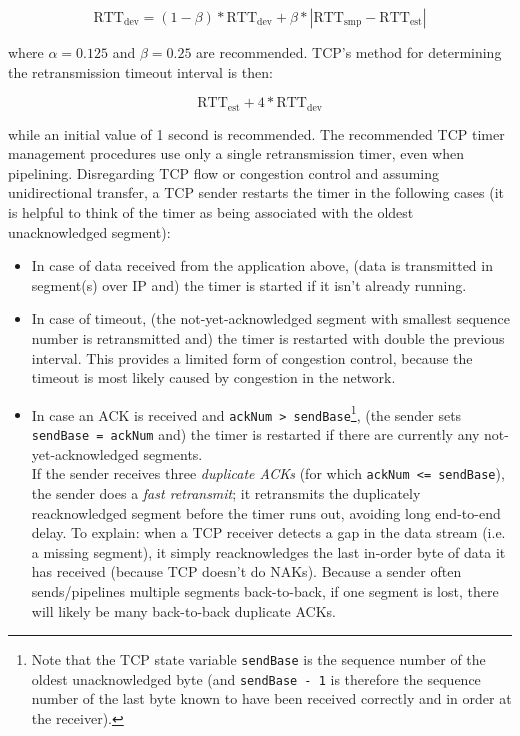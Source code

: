 \documentclass[8pt, table, xcdraw]{article}%
\begin{document}
\begin{equation}
    \text{RTT}_\text{dev} = (1 - \beta) * \text{RTT}_\text{dev} + \beta * |\text{RTT}_\text{smp} - \text{RTT}_\text{est}|
\end{equation}

where $\alpha = 0.125$ and $\beta = 0.25$ are recommended. TCP’s method for determining the retransmission
timeout interval is then:

\begin{equation}
    \text{RTT}_\text{est} + 4 * \text{RTT}_\text{dev}
\end{equation}

while an initial value of 1 second is recommended. The recommended TCP timer management procedures use only a single retransmission timer, even when pipelining. Disregarding TCP flow or congestion control and assuming unidirectional transfer, a TCP sender restarts the timer in the following cases (it is helpful to think of the timer as being associated with the oldest unacknowledged segment):

\begin{itemize}
    \item In case of data received from the application above, (data is transmitted in segment(s) over IP and) the timer is started if it isn't already running.
    \item In case of timeout, (the not-yet-acknowledged segment with smallest sequence number is retransmitted and) the timer is restarted with double the previous interval. This provides a limited form of congestion control, because the timeout is most likely caused by congestion in the network.
    \item In case an ACK is received and \lstinline{ackNum > sendBase}\footnote{Note that the TCP state variable \lstinline{sendBase} is the sequence number of the oldest unacknowledged byte (and \lstinline{sendBase - 1} is therefore the sequence number of the last byte known to have been received correctly and in order at the receiver).}, (the sender sets \lstinline{sendBase = ackNum} and) the timer is restarted if there are currently any not-yet-acknowledged segments.\\
    If the sender receives three \emph{duplicate ACKs} (for which \lstinline{ackNum <= sendBase}), the sender does a \emph{fast retransmit}; it retransmits the duplicately reacknowledged segment before the timer runs out, avoiding long end-to-end delay. To explain: when a TCP receiver detects a gap in the data stream (i.e. a missing segment), it simply reacknowledges the last in-order byte of data it has received (because TCP doesn't do NAKs). Because a sender often sends/pipelines multiple segments back-to-back, if one segment is lost, there will likely be many back-to-back duplicate ACKs.
\end{itemize}
\end{document}
